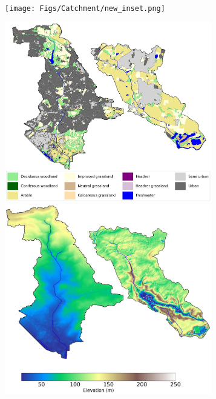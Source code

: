 \documentclass[APA,Times2COL]{WileyNJDv5}
\begin{document}
\begin{figure}[htbp!]
\centering
\begin{subfigure}[b]{.65\textwidth}
\texttt{[image: Figs/Catchment/new\_inset.png]}
\end{subfigure}\qquad
\begin{subfigure}[b]{.3\textwidth}
\includegraphics[width=0.99\textwidth]{Figs/Catchment/LandCover_BothCatchments.jpg}
 \newline
\includegraphics[width=0.99\textwidth]{Figs/Catchment/Terrain_BothCatchments.jpg}\llap{
}
\end{subfigure}
\end{figure}
\end{document}
